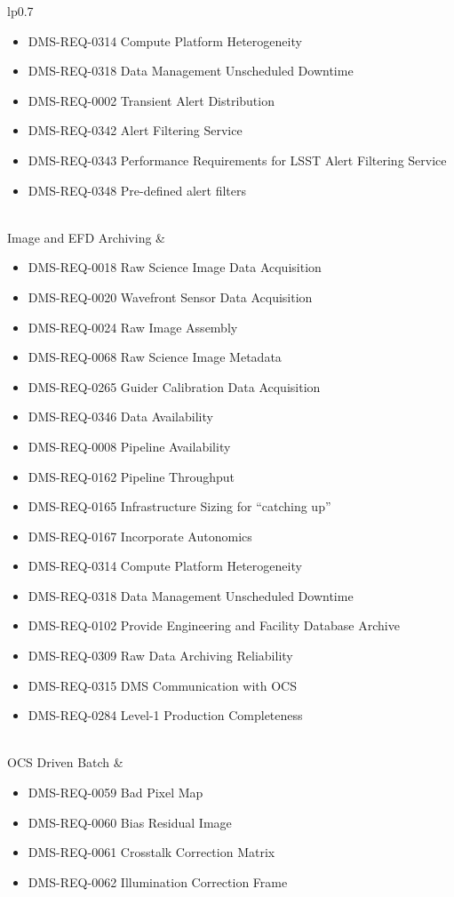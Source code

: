 \begin{xtabular}{lp{0.7\textwidth}}
\begin{itemize}
\item DMS-REQ-0314 Compute Platform Heterogeneity
\item DMS-REQ-0318 Data Management Unscheduled Downtime
\item DMS-REQ-0002 Transient Alert Distribution
\item DMS-REQ-0342 Alert Filtering Service
\item DMS-REQ-0343 Performance Requirements for LSST Alert Filtering Service
\item DMS-REQ-0348 Pre-defined alert filters
\end{itemize} \\ \hline
Image and EFD Archiving &
\begin{itemize}
\item DMS-REQ-0018 Raw Science Image Data Acquisition
\item DMS-REQ-0020 Wavefront Sensor Data Acquisition
\item DMS-REQ-0024 Raw Image Assembly
\item DMS-REQ-0068 Raw Science Image Metadata
\item DMS-REQ-0265 Guider Calibration Data Acquisition
\item DMS-REQ-0346 Data Availability
\item DMS-REQ-0008 Pipeline Availability
\item DMS-REQ-0162 Pipeline Throughput
\item DMS-REQ-0165 Infrastructure Sizing for ``catching up''
\item DMS-REQ-0167 Incorporate Autonomics
\item DMS-REQ-0314 Compute Platform Heterogeneity
\item DMS-REQ-0318 Data Management Unscheduled Downtime
\item DMS-REQ-0102 Provide Engineering and Facility Database Archive
\item DMS-REQ-0309 Raw Data Archiving Reliability
\item DMS-REQ-0315 DMS Communication with OCS
\item DMS-REQ-0284 Level-1 Production Completeness
\end{itemize} \\ \hline
OCS Driven Batch &
\begin{itemize}
\item DMS-REQ-0059 Bad Pixel Map
\item DMS-REQ-0060 Bias Residual Image
\item DMS-REQ-0061 Crosstalk Correction Matrix
\item DMS-REQ-0062 Illumination Correction Frame

\end{itemize}
\end{xtabular}
